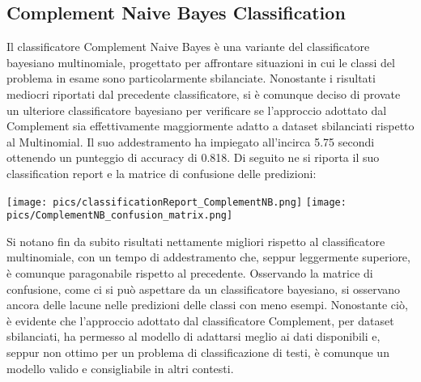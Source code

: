 \documentclass[12pt,oneside]{article}
\begin{document}
     \begin{enumerate}
    \subsection{Complement Naive Bayes Classification}
    \begin{justify}
        Il classificatore Complement Naive Bayes è una variante del classificatore bayesiano multinomiale, progettato per affrontare situazioni in cui le classi del problema in esame sono particolarmente sbilanciate. Nonostante i risultati mediocri riportati dal precedente classificatore, si è comunque deciso di provate un ulteriore classificatore bayesiano per verificare se l’approccio adottato dal Complement sia effettivamente maggiormente adatto a dataset sbilanciati rispetto al Multinomial.
        Il suo addestramento ha impiegato all’incirca 5.75 secondi ottenendo un punteggio di accuracy di 0.818. 
        Di seguito ne si riporta il suo classification report e la matrice di confusione delle predizioni:
    \end{justify}

    \texttt{[image: pics/classificationReport\_ComplementNB.png]}
    \texttt{[image: pics/ComplementNB\_confusion\_matrix.png]}

    \begin{justify}
    Si notano fin da subito risultati nettamente migliori rispetto al classificatore multinomiale, con un tempo di addestramento che, seppur leggermente superiore, è comunque paragonabile rispetto al precedente. Osservando la matrice di confusione, come ci si può aspettare da un classificatore bayesiano, si osservano ancora delle lacune nelle predizioni delle classi con meno esempi. Nonostante ciò, è evidente che l’approccio adottato dal classificatore Complement, per dataset sbilanciati, ha permesso al modello di adattarsi meglio ai dati disponibili e, seppur non ottimo per un problema di classificazione di testi, è comunque un modello valido e consigliabile in altri contesti.
    \end{justify}
    \end{enumerate}
    
\end{document}
